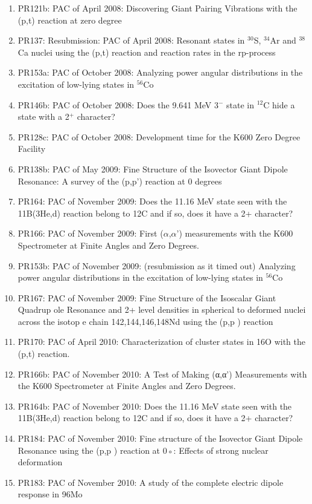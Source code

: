 \documentclass[11pt]{report}
\begin{document}
\begin{enumerate}
\item PR121b: PAC of April 2008:     Discovering Giant Pairing Vibrations with the (p,t) reaction at zero degree 
\item PR137:  Resubmission: PAC of April 2008:     Resonant states in $^{30}$S, $^{34}$Ar and $^{38}$Ca nuclei using the (p,t) reaction and reaction rates in the rp-process 
\item PR153a: PAC of October 2008:     Analyzing power angular distributions in the excitation of low-lying states in $^{56}$Co 
\item PR146b: PAC of October 2008:      Does the 9.641 MeV 3$^-$ state in $^{12}$C hide a state with a 2$^+$ character? 
\item PR128c: PAC of October 2008:      Development time for the K600 Zero Degree Facility 
\item PR138b: PAC of May 2009:     Fine Structure of the Isovector Giant Dipole Resonance: A survey of the (p,p') reaction at 0 degrees 
\item PR164: PAC of November 2009:     Does the 11.16 MeV state seen with the 11B(3He,d) reaction belong to 12C and if so, does it have a 2+ character? 
\item PR166: PAC of November 2009:     First ($\alpha$,$\alpha$’) measurements with the K600 Spectrometer at Finite Angles and Zero Degrees. 
\item PR153b: PAC of November 2009: (resubmission as it timed out) Analyzing power angular distributions in the excitation of low-lying states in $^{56}$Co 
\item PR167: PAC of November 2009:     Fine Structure of the Isoscalar Giant Quadrup ole Resonance and 2+ level densities in spherical to deformed nuclei across the isotop e chain 142,144,146,148Nd using the (p,p ) reaction 
\item PR170: PAC of April 2010:     Characterization of cluster states in 16O with the (p,t) reaction. 
\item PR166b: PAC of November 2010:     A Test of Making (α,α’) Measurements with the K600 Spectrometer at Finite Angles and Zero Degrees. 
\item PR164b: PAC of November 2010:     Does the 11.16 MeV state seen with the 11B(3He,d) reaction belong to 12C and if so, does it have a 2+ character? 
\item PR184: PAC of November 2010:     Fine structure of the Isovector Giant Dipole Resonance using the (p,p ) reaction at 0◦: Eﬀects of strong nuclear deformation 
\item PR183: PAC of November 2010:     A study of the complete electric dipole response in 96Mo 

\end{enumerate}
\end{document}
